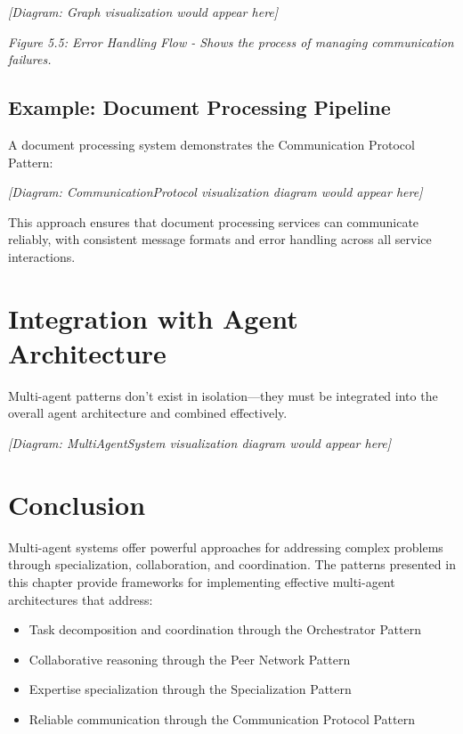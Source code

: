 \documentclass[11pt,oneside]{book}
\providecommand{\tightlist}{%
  \setlength{\itemsep}{0pt}\setlength{\parskip}{0pt}}
\begin{document}
\emph{{[}Diagram: Graph visualization would appear here{]}}

\emph{Figure 5.5: Error Handling Flow - Shows the process of managing
communication failures.}

\subsection{Example: Document Processing
Pipeline}\label{example-document-processing-pipeline}

A document processing system demonstrates the Communication Protocol
Pattern:

\emph{{[}Diagram: CommunicationProtocol visualization diagram would
appear here{]}}

This approach ensures that document processing services can communicate
reliably, with consistent message formats and error handling across all
service interactions.

\section{Integration with Agent
Architecture}\label{integration-with-agent-architecture-1}

Multi-agent patterns don't exist in isolation---they must be integrated
into the overall agent architecture and combined effectively.

\emph{{[}Diagram: MultiAgentSystem visualization diagram would appear
here{]}}

\section{Conclusion}\label{conclusion-1}

Multi-agent systems offer powerful approaches for addressing complex
problems through specialization, collaboration, and coordination. The
patterns presented in this chapter provide frameworks for implementing
effective multi-agent architectures that address:

\begin{itemize}
\tightlist
\item
  Task decomposition and coordination through the Orchestrator Pattern
\item
  Collaborative reasoning through the Peer Network Pattern
\item
  Expertise specialization through the Specialization Pattern
\item
  Reliable communication through the Communication Protocol Pattern
\end{itemize}
\end{document}
